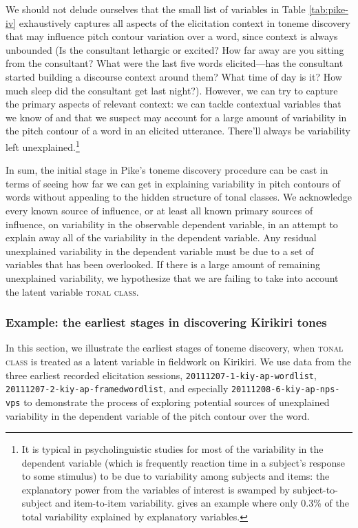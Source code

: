 \documentclass[12pt]{article}
\begin{document}
  We should not delude ourselves that the small list of variables in
Table \ref{tab:pike-iv} exhaustively captures all aspects of the
elicitation context in toneme discovery that may influence pitch
contour variation over a word, since context is always
unbounded (Is the consultant lethargic or excited? How far away are
you sitting from the consultant? What were the last five words
elicited---has the consultant started building a discourse context
around them? What time of day is it?  How much sleep did the consultant
get last night?). However,
we can try to capture the primary aspects of relevant context: we can
tackle contextual variables that we know of and that we suspect may
account for a large amount of variability in the pitch contour of a
word in an elicited utterance. There'll always be variability left
unexplained.\footnote{It is typical in psycholinguistic studies for
  most of the variability in the dependent variable (which is
  frequently reaction time in a subject's response to some stimulus)
  to be due to variability among subjects and items: the explanatory
  power from the variables of interest is swamped by
  subject-to-subject and item-to-item variability. \citet[p.\
  281--282]{Baayen:2008} gives an example where only 0.3\% of the
  total variability explained by explanatory variables.}

In sum, the initial stage in Pike's toneme discovery procedure can be
cast in terms of seeing how far we can get in explaining variability
in pitch contours of words without appealing to the hidden structure
of tonal classes. We acknowledge every known source of influence, or
at least all known primary sources of influence, on variability
in the observable dependent variable, in an attempt to explain away all
of the variability in the dependent variable. Any residual
unexplained variability in the dependent variable must be due to a set
of variables that has been overlooked. If there is a large amount of remaining
unexplained variability, we hypothesize that we are failing to take
into account the latent variable \textsc{tonal class}.

\subsubsection{Example: the earliest stages in discovering Kirikiri tones}
\label{sec:example-latent-kiy}

In this section, we illustrate the earliest stages of toneme
discovery, when \textsc{tonal class} is treated as a latent variable in
fieldwork on Kirikiri. We use data from the three earliest recorded
elicitation sessions, \texttt{20111207-1-kiy-ap-wordlist},
\texttt{20111207-2-kiy-ap-framedwordlist}, and especially
\texttt{20111208-6-kiy-ap-nps-vps} to demonstrate the process of
exploring potential sources of unexplained variability in the
dependent variable of the pitch contour over the word. 
\end{document}
